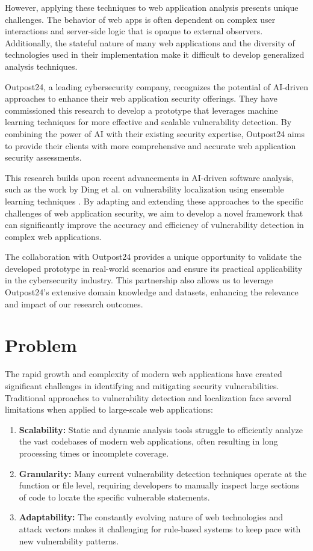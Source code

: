 However, applying these techniques to web application analysis presents unique challenges. The behavior of web apps is often dependent on complex user interactions and server-side logic that is opaque to external observers. Additionally, the stateful nature of many web applications and the diversity of technologies used in their implementation make it difficult to develop generalized analysis techniques.

Outpost24, a leading cybersecurity company, recognizes the potential of AI-driven approaches to enhance their web application security offerings. They have commissioned this research to develop a prototype that leverages machine learning techniques for more effective and scalable vulnerability detection. By combining the power of AI with their existing security expertise, Outpost24 aims to provide their clients with more comprehensive and accurate web application security assessments.

This research builds upon recent advancements in AI-driven software analysis, such as the work by Ding et al. on vulnerability localization using ensemble learning techniques \cite{ding2022velvet}. By adapting and extending these approaches to the specific challenges of web application security, we aim to develop a novel framework that can significantly improve the accuracy and efficiency of vulnerability detection in complex web applications.

The collaboration with Outpost24 provides a unique opportunity to validate the developed prototype in real-world scenarios and ensure its practical applicability in the cybersecurity industry. This partnership also allows us to leverage Outpost24's extensive domain knowledge and datasets, enhancing the relevance and impact of our research outcomes.
    
\section{Problem}
The rapid growth and complexity of modern web applications have created significant challenges in identifying and mitigating security vulnerabilities. Traditional approaches to vulnerability detection and localization face several limitations when applied to large-scale web applications:

\begin{enumerate}
\item \textbf{Scalability:} Static and dynamic analysis tools struggle to efficiently analyze the vast codebases of modern web applications, often resulting in long processing times or incomplete coverage.

\item \textbf{Granularity:} Many current vulnerability detection techniques operate at the function or file level, requiring developers to manually inspect large sections of code to locate the specific vulnerable statements.

\item \textbf{Adaptability:} The constantly evolving nature of web technologies and attack vectors makes it challenging for rule-based systems to keep pace with new vulnerability patterns.
\end{enumerate}

